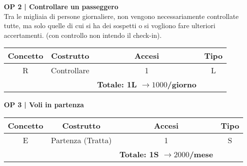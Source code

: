 \vspace{.6cm}


\textbf{\small OP 2 | Controllare un passeggero}\\
\textsf{\small Tra le migliaia di persone giornaliere, non vengono necessariamente controllate tutte, ma solo quelle di cui si ha dei sospetti o si vogliono fare ulteriori accertamenti. (con controllo non intendo il check-in).}\break

\begin{tabular}{ c c c c} %
	\hline
	\textbf{Concetto} & \textbf{Costrutto} & \textbf{Accesi} & \textbf{Tipo}\\
	\hline
	\textsf{\small R} & \textsf{\small Controllare} & \textsf{\small 1} &  \textsf{\small L}\\
	\hline
	\textsf{\small } & \textsf{\small } & \textbf{Totale: 1L $\rightarrow 1000$/giorno} \textsf{\small } & \textsf{\small }\\ %
	\hline
\end{tabular}

\vspace{.6cm}


\textbf{\small OP 3 | Voli in partenza}\\

\begin{tabular}{ c c c c} %
	\hline
	\textbf{Concetto} & \textbf{Costrutto} & \textbf{Accesi} & \textbf{Tipo}\\
	\hline
	\textsf{\small E} & \textsf{\small Partenza (Tratta)} & \textsf{\small 1} &  \textsf{\small S}\\
	\hline
	\textsf{\small } & \textsf{\small } & \textbf{Totale: 1S $\rightarrow 2000$/mese} \textsf{\small } & \textsf{\small }\\
	\hline
\end{tabular}

\vspace{.6cm}


